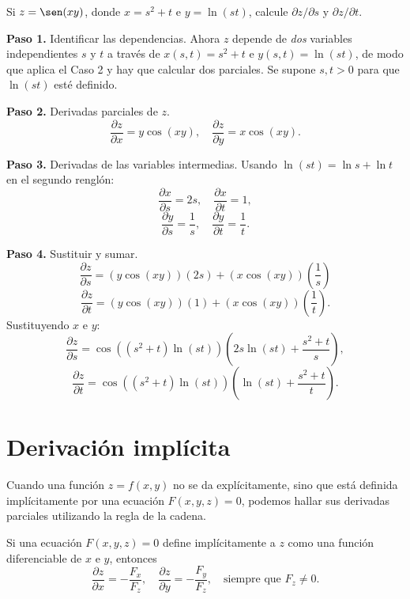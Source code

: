 \begin{example}
Si $z = \sen(xy)$, donde $x = s^2 + t$ e $y = \ln(s t)$, calcule $\partial z/\partial s$ y $\partial z/\partial t$.
\begin{myproof}
\textbf{Paso 1.} Identificar las dependencias. Ahora $z$ depende de \emph{dos}
variables independientes $s$ y $t$ a través de $x(s,t) = s^2 + t$ e
$y(s,t) = \ln(st)$, de modo que aplica el Caso 2 y hay que calcular dos
parciales. Se supone $s,t>0$ para que $\ln(st)$ esté definido.

\textbf{Paso 2.} Derivadas parciales de $z$.
\[
\frac{\partial z}{\partial x} = y \cos(xy), \quad \frac{\partial z}{\partial y} = x \cos(xy).
\]

\textbf{Paso 3.} Derivadas de las variables intermedias. Usando
$\ln(st)=\ln s+\ln t$ en el segundo renglón:
\[
\frac{\partial x}{\partial s} = 2s, \quad \frac{\partial x}{\partial t} = 1,
\]
\[
\frac{\partial y}{\partial s} = \frac{1}{s}, \quad \frac{\partial y}{\partial t} = \frac{1}{t}.
\]

\textbf{Paso 4.} Sustituir y sumar.
\[
\frac{\partial z}{\partial s} = (y \cos(xy))(2s) + (x \cos(xy))\left(\frac{1}{s}\right)
\]
\[
\frac{\partial z}{\partial t} = (y \cos(xy))(1) + (x \cos(xy))\left(\frac{1}{t}\right).
\]
Sustituyendo $x$ e $y$:
\[
\frac{\partial z}{\partial s} = \boxed{\cos((s^2+t)\ln(st))\left(2s \ln(st) + \frac{s^2+t}{s}\right)},
\]
\[
\frac{\partial z}{\partial t} = \boxed{\cos((s^2+t)\ln(st))\left(\ln(st) + \frac{s^2+t}{t}\right)}.
\]
\end{myproof}
\end{example}



\section{Derivación implícita}

Cuando una función $z = f(x, y)$ no se da explícitamente, sino que está definida implícitamente por una ecuación $F(x, y, z) = 0$, podemos hallar sus derivadas parciales utilizando la regla de la cadena.

\begin{theorem}
Si una ecuación $F(x, y, z) = 0$ define implícitamente a $z$ como una función diferenciable de $x$ e $y$, entonces
\[
\frac{\partial z}{\partial x} = -\frac{F_x}{F_z}, \quad \frac{\partial z}{\partial y} = -\frac{F_y}{F_z}, \quad \text{siempre que } F_z \neq 0.
\]
\end{theorem}

